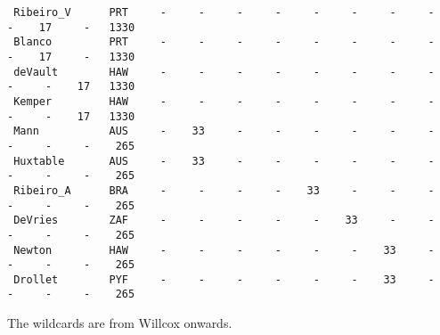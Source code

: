 \documentclass[12pt]{article}
\begin{document}
{\begin{verbatim}
 Ribeiro_V      PRT     -     -     -     -     -     -     -     -     -    17     -   1330
 Blanco         PRT     -     -     -     -     -     -     -     -     -    17     -   1330
 deVault        HAW     -     -     -     -     -     -     -     -     -     -    17   1330
 Kemper         HAW     -     -     -     -     -     -     -     -     -     -    17   1330
 Mann           AUS     -    33     -     -     -     -     -     -     -     -     -    265
 Huxtable       AUS     -    33     -     -     -     -     -     -     -     -     -    265
 Ribeiro_A      BRA     -     -     -     -    33     -     -     -     -     -     -    265
 DeVries        ZAF     -     -     -     -     -    33     -     -     -     -     -    265
 Newton         HAW     -     -     -     -     -     -    33     -     -     -     -    265
 Drollet        PYF     -     -     -     -     -     -    33     -     -     -     -    265
\end{verbatim}
}
The wildcards are from Willcox onwards.
\end{document}

